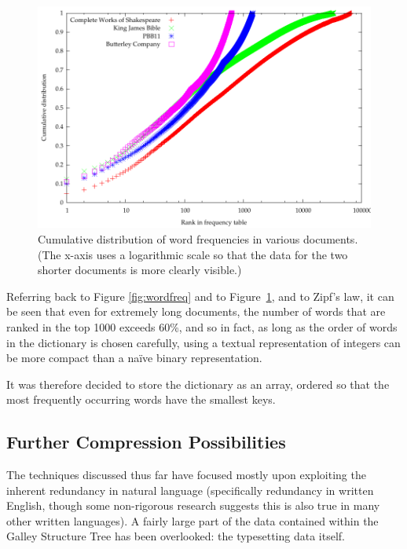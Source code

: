 \begin{figure}
  \begin{center}
  \includegraphics[width=\textwidth]{gnuplot/cumulative}
  \end{center}
  \caption[Cumulative distribution of word frequencies]{Cumulative distribution of word frequencies in various documents. (The x-axis uses a logarithmic scale so that the data for the two shorter documents is more clearly visible.)}
  \label{fig:cumulative}
\end{figure}

Referring back to Figure \ref{fig:wordfreq} and to Figure~\ref{fig:cumulative}, and to Zipf's law, it can be seen that even for extremely long documents, the number of words that are ranked in the top 1000 exceeds 60\%, and so in fact, as long as the order of words in the dictionary is chosen carefully, using a textual representation of integers can be more compact than a na\"ive binary representation.

It was therefore decided to store the dictionary as an array, ordered so that the most frequently occurring words have the smallest keys.

\subsection{Further Compression Possibilities}
\label{sec:deltas}

The techniques discussed thus far have focused mostly upon exploiting the inherent redundancy in natural language (specifically redundancy in written English, though some non-rigorous research suggests this is also true in many other written languages). A fairly large part of the data contained within the Galley Structure Tree has been overlooked: the typesetting data itself.

